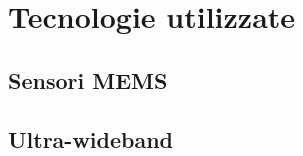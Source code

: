 \chapter{Tecnologie utilizzate}
\label{tecnologie}

\section{Sensori MEMS}

\section{Ultra-wideband}